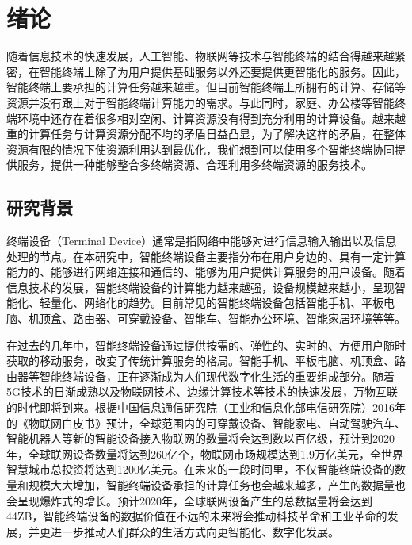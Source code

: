 \chapter{绪论}\label{chap:introduction}

随着信息技术的快速发展，人工智能、物联网等技术与智能终端的结合得越来越紧密，在智能终端上除了为用户提供基础服务以外还要提供更智能化的服务。因此，智能终端上要承担的计算任务越来越重。但目前智能终端上所拥有的计算、存储等资源并没有跟上对于智能终端计算能力的需求。与此同时，家庭、办公楼等智能终端环境中还存在着很多相对空闲、计算资源没有得到充分利用的计算设备。越来越重的计算任务与计算资源分配不均的矛盾日益凸显，为了解决这样的矛盾，在整体资源有限的情况下使资源利用达到最优化，我们想到可以使用多个智能终端协同提供服务，提供一种能够整合多终端资源、合理利用多终端资源的服务技术。

\section{研究背景}

终端设备（Terminal Device）通常是指网络中能够对进行信息输入输出以及信息处理的节点。在本研究中，智能终端设备主要指分布在用户身边的、具有一定计算能力的、能够进行网络连接和通信的、能够为用户提供计算服务的用户设备。随着信息技术的发展，智能终端设备的计算能力越来越强，设备规模越来越小，呈现智能化、轻量化、网络化的趋势。目前常见的智能终端设备包括智能手机、平板电脑、机顶盒、路由器、可穿戴设备、智能车、智能办公环境、智能家居环境等等。

在过去的几年中，智能终端设备通过提供按需的、弹性的、实时的、方便用户随时获取的移动服务，改变了传统计算服务的格局\citep{施巍松2017边缘计算}。智能手机、平板电脑、机顶盒、路由器等智能终端设备，正在逐渐成为人们现代数字化生活的重要组成部分。随着5G技术的日渐成熟以及物联网技术、边缘计算技术等技术的快速发展，万物互联的时代即将到来。根据中国信息通信研究院（工业和信息化部电信研究院）2016年的《物联网白皮书》预计，全球范围内的可穿戴设备、智能家电、自动驾驶汽车、智能机器人等新的智能设备接入物联网的数量将会达到数以百亿级，预计到2020年，全球联网设备数量将达到260亿个，物联网市场规模达到1.9万亿美元，全世界智慧城市总投资将达到1200亿美元\citep{物联网白皮书2016}。在未来的一段时间里，不仅智能终端设备的数量和规模大大增加，智能终端设备承担的计算任务也会越来越多，产生的数据量也会呈现爆炸式的增长。预计2020年，全球联网设备产生的总数据量将会达到44ZB\citep{物联网白皮书2016}，智能终端设备的数据价值在不远的未来将会推动科技革命和工业革命的发展，并更进一步推动人们群众的生活方式向更智能化、数字化发展。

